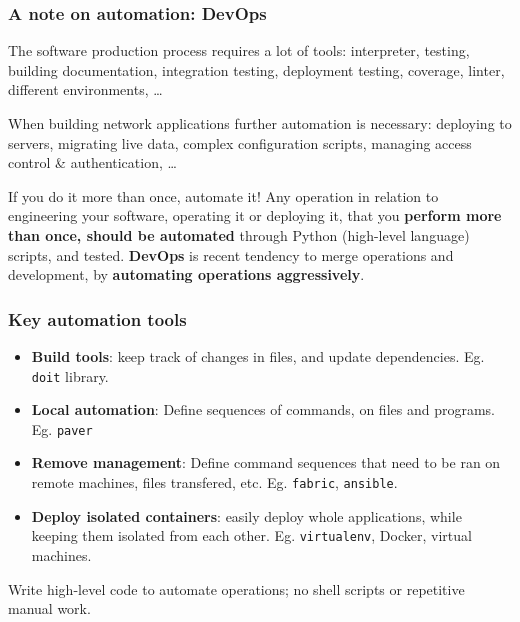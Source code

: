 \documentclass{beamer} %
\newcommand\emc[1]{\textcolor{brightblue}{\textbf{#1}}}
\begin{document}
\begin{frame}

\frametitle{A note on automation: DevOps}

The software production process requires a lot of tools: interpreter, testing, building documentation, integration testing, deployment testing, coverage, linter, different environments, \ldots

\vspace{5mm}
When building network applications further automation is necessary: deploying to servers, migrating live data, complex configuration scripts, managing access control \& authentication, \ldots

\vspace{5mm}
\begin{block}{If you do it more than once, automate it!}
Any operation in relation to engineering your software, operating it or deploying it, that you \emc{perform more than once, should be automated} through Python (high-level language) scripts, and tested. \emc{DevOps} is recent tendency to merge operations and development, by \emc{automating operations aggressively}. 
\end{block}

\end{frame}

\begin{frame}

\frametitle{Key automation tools}

\begin{itemize}
\item \emc{Build tools}: keep track of changes in files, and update dependencies. Eg. \texttt{doit} library.
\item \emc{Local automation}: Define sequences of commands, on files and programs. Eg. \texttt{paver}
\item \emc{Remove management}: Define command sequences that need to be ran on remote machines, files transfered, etc. Eg. \texttt{fabric}, \texttt{ansible}.
\item \emc{Deploy isolated containers}: easily deploy whole applications, while keeping them isolated from each other. Eg. \texttt{virtualenv}, Docker, virtual machines.
  \end{itemize}

Write high-level code to automate operations; no shell scripts or repetitive manual work.

\end{frame}
\end{document}
